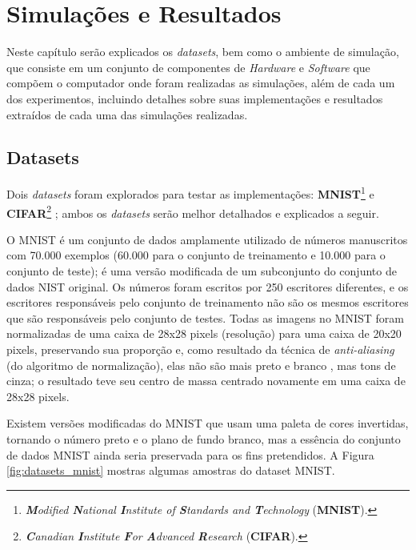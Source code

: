 \chapter{Simulações e Resultados}
\label{cha:results}

Neste capítulo serão explicados os \textit{datasets}, bem como o ambiente de simulação, que consiste em um conjunto de componentes de \textit{Hardware} e \textit{Software} que compõem o computador onde foram realizadas as simulações, além de cada um dos experimentos, incluindo detalhes sobre suas implementações e resultados extraídos de cada uma das simulações realizadas.



\section{Datasets}
\label{sec:results_datasets}

Dois \textit{datasets} foram explorados para testar as implementações: \textbf{MNIST}\footnote{\textit{\textbf{M}odified \textbf{N}ational \textbf{I}nstitute of \textbf{S}tandards and \textbf{T}echnology} (\textbf{MNIST}).} \citep{lecun-mnisthandwrittendigit-2010} e \textbf{CIFAR}\footnote{\textit{\textbf{C}anadian \textbf{I}nstitute \textbf{F}or \textbf{A}dvanced \textbf{R}esearch} (\textbf{CIFAR}).} \citep{cifar-dataset}; ambos os \textit{datasets} serão melhor detalhados e explicados a seguir.

O MNIST é um conjunto de dados amplamente utilizado de números manuscritos com 70.000 exemplos (60.000 para o conjunto de treinamento e 10.000 para o conjunto de teste); é uma versão modificada de um subconjunto do conjunto de dados NIST original. Os números foram escritos por 250 escritores diferentes, e os escritores responsáveis pelo conjunto de treinamento não são os mesmos escritores que são responsáveis pelo conjunto de testes. Todas as imagens no MNIST foram normalizadas de uma caixa de 28x28 pixels (resolução) para uma caixa de 20x20 pixels, preservando sua proporção e, como resultado da técnica de \textit{anti-aliasing} (do algoritmo de normalização), elas não são mais preto e branco , mas tons de cinza; o resultado teve seu centro de massa centrado novamente em uma caixa de 28x28 pixels.

Existem versões modificadas do MNIST que usam uma paleta de cores invertidas, tornando o número preto e o plano de fundo branco, mas a essência do conjunto de dados MNIST ainda seria preservada para os fins pretendidos. A Figura \ref{fig:datasets_mnist} mostras algumas amostras do dataset MNIST.


